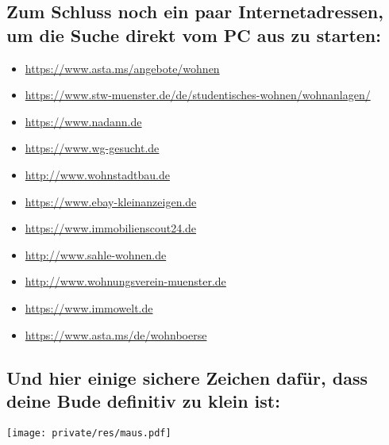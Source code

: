 \begin{multicols*}{2}
\subsection*{Zum Schluss noch ein paar Internetadressen, um die Suche direkt vom PC aus zu starten:}
\vspace{-1ex}
\begin{itemize}[leftmargin=0.8cm]
	\raggedright
	\item \url{https://www.asta.ms/angebote/wohnen}
        \item \url{https://www.stw-muenster.de/de/studentisches-wohnen/wohnanlagen/}
	\item \url{https://www.nadann.de}
	\item \url{https://www.wg-gesucht.de}
	\item \url{http://www.wohnstadtbau.de}
	\item \url{https://www.ebay-kleinanzeigen.de}
	\item \url{https://www.immobilienscout24.de}
	\item \url{http://www.sahle-wohnen.de}
	\item \url{http://www.wohnungsverein-muenster.de}
	\item \url{https://www.immowelt.de}
	\item \url{https://www.asta.ms/de/wohnboerse}
\end{itemize}

\vspace{-2ex}
\subsection*{Und hier einige sichere Zeichen dafür, dass deine Bude definitiv zu klein ist:}
\hspace{1.5cm}\texttt{[image: private/res/maus.pdf]}

\vspace{-\parskip}\vspace{-0.1cm}
\setlength{\fboxsep}{0.2cm}

\end{multicols*}

